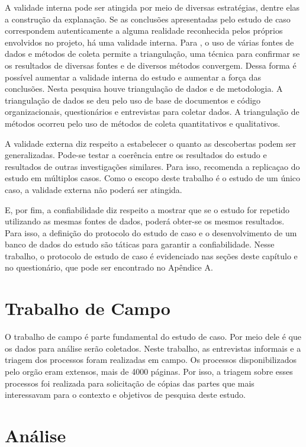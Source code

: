 A validade interna pode ser atingida por meio de diversas estratégias, dentre elas a construção da explanação. Se as conclusões apresentadas pelo estudo de caso correspondem autenticamente a alguma realidade reconhecida pelos próprios envolvidos no projeto, há uma validade interna. Para , o uso de várias fontes de dados e métodos de coleta permite a triangulação, uma técnica para confirmar se os resultados
de diversas fontes e de diversos métodos convergem. Dessa forma é possível aumentar a
validade interna do estudo e aumentar a força das conclusões. Nesta pesquisa houve
triangulação de dados  e de metodologia. A triangulação de dados se deu
pelo uso de base de documentos e código organizacionais, questionários e entrevistas para coletar dados. A triangulação
de métodos ocorreu pelo uso de métodos de coleta quantitativos e qualitativos.

A validade externa diz respeito a estabelecer o quanto as descobertas podem ser generalizadas. Pode-se testar a coerência entre os resultados
do estudo e resultados de outras investigações similares. Para isso,  recomenda a replicaçao do estudo em múltiplos casos. Como o escopo deste trabalho é o estudo de um único caso, a validade externa não poderá ser atingida.

E, por fim, a confiabilidade diz respeito a mostrar que se o estudo for repetido utilizando as mesmas fontes de dados, poderá obter-se os mesmos resultados. Para isso, a definição do protocolo do estudo de caso e o 
desenvolvimento de um banco de dados do estudo são táticas para garantir a confiabilidade. Nesse trabalho, o protocolo de estudo de caso é evidenciado nas seções deste capítulo e no questionário, que pode ser encontrado no Apêndice A.


\section[Trabalho de Campo]{Trabalho de Campo}

O trabalho de campo é parte fundamental do estudo de caso. Por meio dele é que os dados para análise serão coletados. Neste trabalho, as entrevistas informais e a triagem dos processos foram realizadas em campo. Os processos disponibilizados pelo orgão eram extensos, mais de 4000 páginas. Por isso, a triagem sobre esses processos foi realizada para solicitação de cópias das partes que mais interessavam para o contexto e objetivos de pesquisa deste estudo.

\section[Análise]{Análise} 


